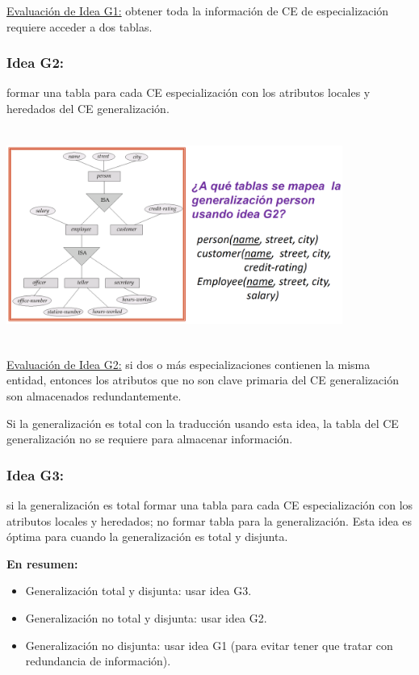 \documentclass[12pt,a4paper]{report}
\begin{document}
				\underline{Evaluación de Idea G1:} obtener toda la información de CE de especialización requiere acceder a dos tablas.
			
			\subsubsection{Idea G2:} formar una tabla para cada CE especialización con los atributos locales y heredados del CE generalización.
			
				\begin{center}
					\includegraphics[width=11cm, height=7cm]{./imagenes/g2.png}
				\end{center}
			
				\underline{Evaluación de Idea G2:} si dos o más especializaciones contienen la misma entidad, entonces los atributos que no son clave primaria del CE generalización son almacenados redundantemente.
				
				\par Si la generalización es total con la traducción usando esta idea, la tabla del CE generalización no se requiere para almacenar información.
			
			\subsubsection{Idea G3:} si la generalización es total formar una tabla para cada CE especialización con los atributos locales y heredados; no formar tabla para la generalización. Esta idea es óptima para cuando la generalización es total y disjunta.

			\vspace{7mm}
			\textbf{En resumen:}
			\begin{itemize}
				\item Generalización total y disjunta: usar idea G3.
				\item Generalización no total y disjunta: usar idea G2.
				\item Generalización no disjunta: usar idea G1 (para evitar tener que tratar con redundancia de información).
			\end{itemize}
\end{document}
